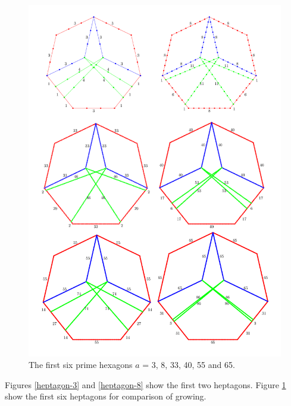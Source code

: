 \documentclass[11pt]{article}
\begin{document}
\begin{figure}[htp]
\centering
\includegraphics[scale=0.78]{gen}
\caption{The first six prime hexagons $a$ = 3, 8, 33, 40, 55 and 65.}
\label{gen}
\end{figure}

Figures \ref{heptagon-3} and \ref{heptagon-8} show the first two heptagons.
Figure \ref{gen} show the first six heptagons for comparison of growing.
\end{document}
